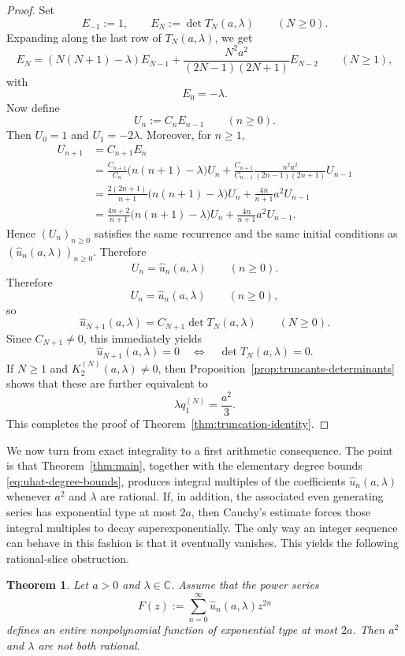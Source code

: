 \documentclass[11pt,letterpaper]{amsart}
\numberwithin{equation}{section}
\theoremstyle{plain}
\newtheorem{theorem}{Theorem}
\theoremstyle{remark}
\begin{document}
\begin{proof}
Set
\[
E_{-1}:=1,
\qquad
E_N:=\det T_N(a,\lambda)
\qquad(N\ge 0).
\]
Expanding along the last row of \(T_N(a,\lambda)\), we get
\[
E_N=(N(N+1)-\lambda)E_{N-1}
+\frac{N^2a^2}{(2N-1)(2N+1)}E_{N-2}
\qquad(N\ge 1),
\]
with
\[
E_0=-\lambda.
\]
Now define
\[
U_n:=C_nE_{n-1}
\qquad(n\ge 0).
\]
Then \(U_0=1\) and \(U_1=-2\lambda\). Moreover, for \(n\ge 1\),
\begin{align*}
U_{n+1}
&=C_{n+1}E_n \\
&=\frac{C_{n+1}}{C_n}\bigl(n(n+1)-\lambda\bigr)U_n
+\frac{C_{n+1}}{C_{n-1}}\frac{n^2a^2}{(2n-1)(2n+1)}U_{n-1} \\
&=\frac{2(2n+1)}{n+1}\bigl(n(n+1)-\lambda\bigr)U_n
+\frac{4n}{n+1}a^2U_{n-1} \\
&=\frac{4n+2}{n+1}\bigl(n(n+1)-\lambda\bigr)U_n
+\frac{4n}{n+1}a^2U_{n-1}.
\end{align*}
Hence \((U_n)_{n\ge 0}\) satisfies the same recurrence and the same initial conditions as
\((\widehat u_n(a,\lambda))_{n\ge 0}\). Therefore
\[
U_n=\widehat u_n(a,\lambda)
\qquad(n\ge 0).
\]
Therefore
\[
U_n=\widehat u_n(a,\lambda)
\qquad(n\ge 0),
\]
so
\[
\widehat u_{N+1}(a,\lambda)=C_{N+1}\det T_N(a,\lambda)
\qquad(N\ge 0).
\]
Since \(C_{N+1}\neq 0\), this immediately yields
\[
\widehat u_{N+1}(a,\lambda)=0
\quad\Longleftrightarrow\quad
\det T_N(a,\lambda)=0.
\]
If \(N\ge 1\) and \(K_2^{(N)}(a,\lambda)\neq 0\), then
Proposition~\ref{prop:truncants-determinants} shows that these are further equivalent to
\[
\lambda q_1^{(N)}=\frac{a^2}{3}.
\]
This completes the proof of Theorem~\ref{thm:truncation-identity}.
\end{proof}

We now turn from exact integrality to a first arithmetic consequence. The point is that
Theorem~\ref{thm:main}, together with the elementary degree bounds
\eqref{eq:uhat-degree-bounds}, produces integral multiples of the coefficients
\(\widehat u_n(a,\lambda)\) whenever \(a^2\) and \(\lambda\) are rational. If, in addition,
the associated even generating series has exponential type at most \(2a\), then Cauchy's
estimate forces those integral multiples to decay superexponentially. The only way an integer
sequence can behave in this fashion is that it eventually vanishes. This yields the following
rational-slice obstruction.

\begin{theorem}\label{thm:rational-slice}
Let $a>0$ and $\lambda\in\mathbb C$. Assume that the power series
\begin{equation}\label{eq:F-def-rational-slice}
F(z):=\sum_{n=0}^{\infty}\widehat u_n(a,\lambda)z^{2n}
\end{equation}
defines an entire nonpolynomial function of exponential type at most $2a$. Then $a^2$ and $\lambda$ are not both rational.
\end{theorem}
\end{document}
